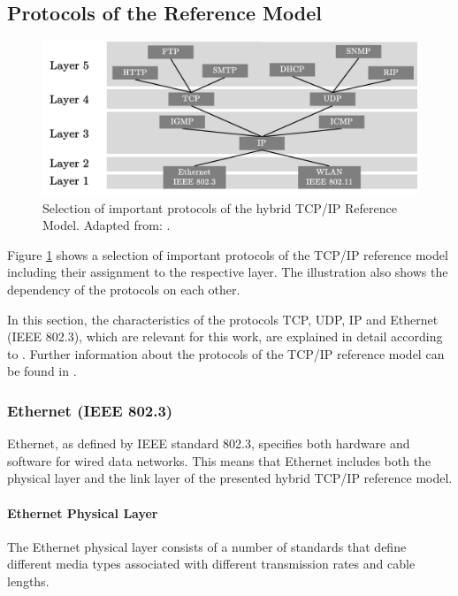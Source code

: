 \subsection{Protocols of the Reference Model} \label{chap:ProtosRefModel}

\begin{figure}[h]
    \centering
    \includegraphics[width=1\linewidth]{figures/tcpip_refmodel/image4.pdf}
    \caption[Selection of important protocols of the hybrid TCP/IP Reference Model]{Selection of important protocols of the hybrid TCP/IP Reference Model. Adapted from: \cite{Weigel2021}.}
    \label{fig:RefModelProtos}
\end{figure}

Figure \ref{fig:RefModelProtos} shows a selection of important protocols of the TCP/IP reference model including their assignment to the respective layer. The illustration also shows the dependency of the protocols on each other.

In this section, the characteristics of the protocols TCP, UDP, IP and Ethernet (IEEE 802.3), which are relevant for this work, are explained in detail according to \cite{Tanenbaum2010}. Further information about the protocols of the TCP/IP reference model can be found in \cite{Tanenbaum2010}.


\subsubsection{Ethernet (IEEE 802.3)}
Ethernet, as defined by IEEE standard 802.3, specifies both hardware and software for wired data networks.  This means that Ethernet includes both the physical layer and the link layer of the presented hybrid TCP/IP reference model.


\paragraph{Ethernet Physical Layer}
The Ethernet physical layer consists of a number of standards that define different media types associated with different transmission rates and cable lengths. 

